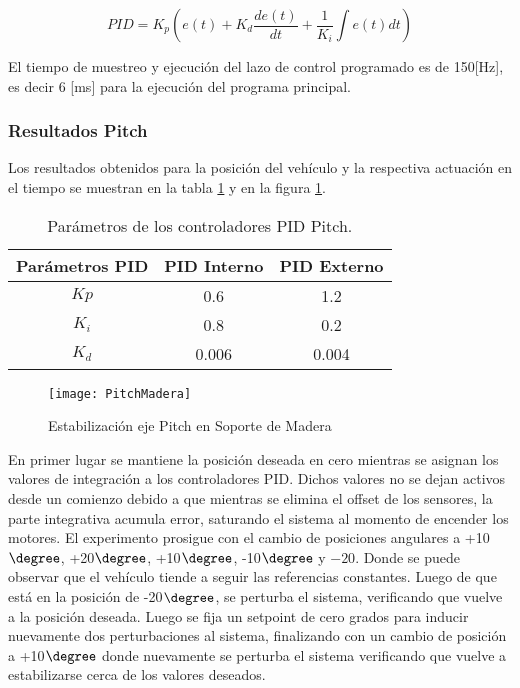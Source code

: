 \documentclass[../main.tex]{subfiles}
\begin{document}
\begin{equation}
PID=K_{p}(e(t)+K_{d}\frac{de(t)}{dt}+\frac{1}{K_{i}}\int e(t)dt)
\end{equation}

El tiempo de muestreo y ejecución del lazo de control programado es de 150[Hz], es decir 6 [ms] para la ejecución del programa principal. 


\subsubsection{Resultados Pitch}

Los resultados obtenidos para la posición del vehículo y la respectiva
actuación en el tiempo se muestran en la tabla \ref{table: Parametros Pitch Ma} y en la figura \ref{fig: Resultado Pitch Grafico Ma}.

\begin{table}[H]
\noindent \begin{centering}
\begin{tabular}{|c|c|c|}
\hline 
Parámetros PID & PID Interno & PID Externo\tabularnewline
\hline 
\hline 
$Kp$ & 0.6 & 1.2\tabularnewline
\hline 
$K_{i}$ & 0.8 & 0.2\tabularnewline
\hline 
$K_{d}$ & 0.006 & 0.004\tabularnewline
\hline 
\end{tabular}
\par\end{centering}
\caption{Parámetros de los controladores PID Pitch.}\label{table: Parametros Pitch Ma}\noindent
\end{table}

\begin{figure}[H]
\noindent \begin{centering}
\texttt{[image: PitchMadera]}
\par\end{centering}
\caption{Estabilización eje Pitch en Soporte de Madera}\label{fig: Resultado Pitch Grafico Ma}\noindent
\end{figure}

En primer lugar se mantiene la posición deseada en cero mientras se
asignan los valores de integración a los controladores PID. Dichos
valores no se dejan activos desde un comienzo debido a que mientras
se elimina el offset de los sensores, la parte integrativa acumula
error, saturando el sistema al momento de encender los motores. El
experimento prosigue con el cambio de posiciones angulares a +10$\degree$,
+20$\degree$, +10$\degree$, -10$\degree$
y $-20$. Donde se puede observar que el vehículo tiende a seguir
las referencias constantes. Luego de que está en la posición de -20$\degree$,
se perturba el sistema, verificando que vuelve a la posición deseada.
Luego se fija un setpoint de cero grados para inducir nuevamente dos
perturbaciones al sistema, finalizando con un cambio de posición a
+10$\degree$ donde nuevamente se perturba el sistema verificando
que vuelve a estabilizarse cerca de los valores deseados.
\end{document}
